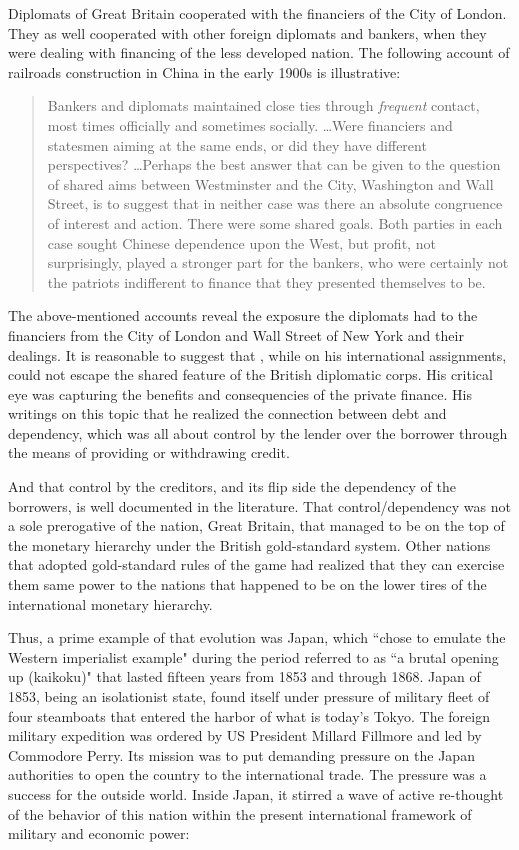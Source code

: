 Diplomats of Great Britain cooperated with the financiers of the City of London. They as well cooperated with other foreign diplomats and bankers, when they were dealing with financing of the less developed nation. The following account of railroads construction in China in the early 1900s is illustrative:

\begin{quote}
Bankers and diplomats maintained close ties through \textit{frequent} contact, most times officially and sometimes socially. \dots Were financiers and statesmen aiming at the same ends, or did they have different perspectives? \dots Perhaps the best answer that can be given to the question of shared aims between Westminster and the City, Washington and Wall Street, is to suggest that in neither case was there an absolute congruence of interest and action. There were some shared goals. Both parties in each case sought Chinese dependence upon the West, but profit, not surprisingly, played a stronger part for the bankers, who were certainly not the patriots indifferent to finance that they presented themselves to be. \citep[p.~263, emphasis added]{davis1982}
\end{quote}

The above-mentioned accounts reveal the exposure the diplomats had to the financiers from the City of London and Wall Street of New York and their dealings. It is reasonable to suggest that \citeauthor{innes1913}, while on his international assignments, could not escape the shared feature of the British diplomatic corps. His critical eye was capturing the benefits and consequencies of the private finance. His writings on this topic that he realized the connection between debt and dependency, which was all about control by the lender over the borrower through the means of providing or withdrawing credit. 

And that control by the creditors, and its flip side the dependency of the borrowers, is well documented in the literature. That control/dependency was not a sole prerogative of the nation, Great Britain, that managed to be on the top of the monetary hierarchy under the British gold-standard system. Other nations that adopted gold-standard rules of the game had realized that they can exercise them same power to the nations that happened to be on the lower tires of the international monetary hierarchy. 

Thus, a prime example of that evolution was Japan, which ``chose to emulate the Western imperialist example" during the period referred to as ``a brutal opening up (kaikoku)" \citep[p.~61]{schiltz2012} that lasted fifteen years from 1853 and through 1868. Japan of 1853, being an isolationist state, found itself under pressure of military fleet of four steamboats that entered the harbor of what is today's Tokyo. The foreign military expedition was ordered by US President Millard Fillmore and led by Commodore Perry. Its mission was to put demanding pressure on the Japan authorities to open the country to the international trade. The pressure was a success for the outside world. Inside Japan, it stirred a wave of active re-thought of the behavior of this nation within the present international framework of military and economic power:

